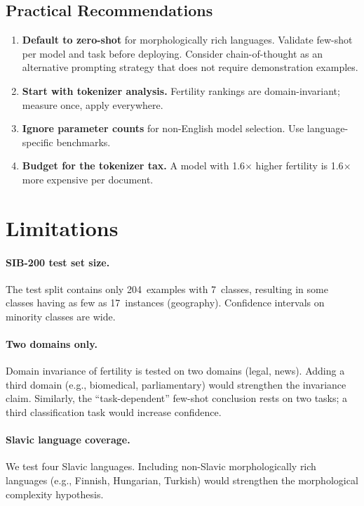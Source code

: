 \documentclass[11pt,a4paper]{article}
\begin{document}
\subsection{Practical Recommendations}

\begin{enumerate}[leftmargin=*]
    \item \textbf{Default to zero-shot} for morphologically rich languages. Validate few-shot per model and task before deploying. Consider chain-of-thought \citep{wei2022chain} as an alternative prompting strategy that does not require demonstration examples.
    \item \textbf{Start with tokenizer analysis.} Fertility rankings are domain-invariant; measure once, apply everywhere.
    \item \textbf{Ignore parameter counts} for non-English model selection. Use language-specific benchmarks.
    \item \textbf{Budget for the tokenizer tax.} A model with 1.6$\times$ higher fertility is 1.6$\times$ more expensive per document.
\end{enumerate}

\section{Limitations}

\paragraph{SIB-200 test set size.} The test split contains only 204~examples with 7~classes, resulting in some classes having as few as 17~instances (geography). Confidence intervals on minority classes are wide.

\paragraph{Two domains only.} Domain invariance of fertility is tested on two domains (legal, news). Adding a third domain (e.g., biomedical, parliamentary) would strengthen the invariance claim. Similarly, the ``task-dependent'' few-shot conclusion rests on two tasks; a third classification task would increase confidence.

\paragraph{Slavic language coverage.} We test four Slavic languages. Including non-Slavic morphologically rich languages (e.g., Finnish, Hungarian, Turkish) would strengthen the morphological complexity hypothesis.
\end{document}

